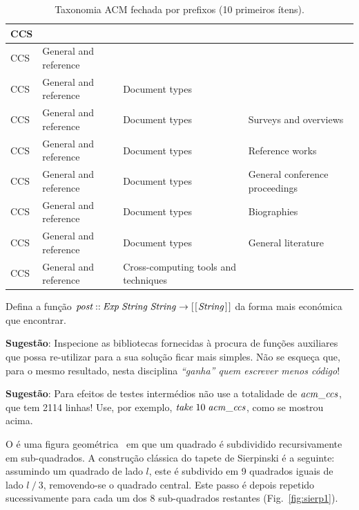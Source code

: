 \documentclass[a4paper]{article}
\newcommand{\Conid}[1]{\mathit{#1}}
\newcommand{\Varid}[1]{\mathit{#1}}
\begin{document}
\begin{enumerate}
\begin{table}[ht!]
\centering\small
\begin{center}
\begin{tabular}{|l|l|l|l|}
\hline
CCS & & & 
\\\hline
CCS & General and reference & & 
\\\hline
CCS & General and reference & Document types & 
\\\hline
CCS & General and reference & Document types & Surveys and overviews
\\\hline
CCS & General and reference & Document types & Reference works
\\\hline
CCS & General and reference & Document types & General conference proceedings
\\\hline
CCS & General and reference & Document types & Biographies
\\\hline
CCS & General and reference & Document types & General literature
\\\hline
CCS & General and reference & Cross-computing tools and techniques & 
\\\hline
\end{tabular}
\end{center}
\caption{Taxonomia ACM fechada por prefixos (10 primeiros ítens).}
\label{table:acmccs}
\end{table}

Defina a função \ensuremath{\Varid{post}\mathbin{::}\Conid{Exp}\;\Conid{String}\;\Conid{String}\to [\mskip1.5mu [\mskip1.5mu \Conid{String}\mskip1.5mu]\mskip1.5mu]} da forma mais económica que encontrar.
\end{enumerate}

\textbf{Sugestão}: Inspecione as bibliotecas fornecidas à procura de funções
auxiliares que possa re-utilizar para a sua solução ficar mais simples.
Não se esqueça que, para o mesmo resultado,
nesta disciplina \emph{``ganha'' quem escrever menos código}!

\textbf{Sugestão}: Para efeitos de testes intermédios não use a totalidade de \ensuremath{\Varid{acm\char95 ccs}},
que tem 2114 linhas! Use, por exemplo, \ensuremath{\Varid{take}\;\mathrm{10}\;\Varid{acm\char95 ccs}}, como se mostrou acima.

\Problema

O  é uma figura geométrica \fractal\ em que um quadrado é subdividido recursivamente em sub-quadrados. A construção clássica do tapete de Sierpinski é a seguinte: assumindo um quadrado de lado \ensuremath{\Varid{l}}, este é subdivido em 9 quadrados iguais de lado \ensuremath{\Varid{l}\mathbin{/}\mathrm{3}}, removendo-se o quadrado central. Este passo é depois repetido sucessivamente para cada um dos 8 sub-quadrados restantes (Fig.~\ref{fig:sierp1}).
\end{document}
